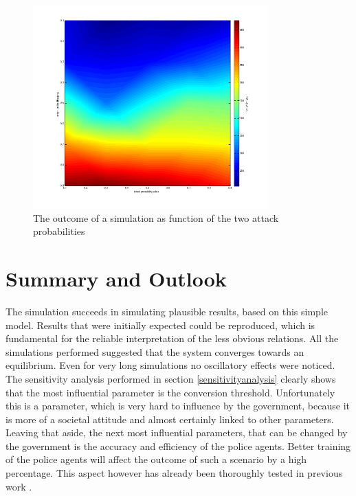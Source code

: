 \documentclass[11pt]{article}
\begin{document}
\begin{figure}[h!]
	\centering
	\includegraphics[width=9cm]{attackprob.png}
   \caption{The outcome of a simulation as function of the two attack probabilities}\label{attackprob}
\end{figure}
\newpage
\section{Summary and Outlook}
The simulation succeeds in simulating plausible results, based on this simple model. Results that were initially expected could be reproduced, which is fundamental for the reliable interpretation of the less obvious relations. All the simulations performed suggested that the system converges towards an equilibrium. Even for very long simulations no oscillatory effects were noticed. The sensitivity analysis performed in section \ref{sensitivityanalysis} clearly shows that the most influential parameter is the conversion threshold. Unfortunately this is a parameter, which is very hard to influence by the government, because it is more of a societal attitude and almost certainly linked to other parameters. Leaving that aside, the next most influential parameters, that can be changed by the government is the accuracy and efficiency of the police agents. Better training of the police agents will affect the outcome of such a scenario by a high percentage. This aspect however has already been thoroughly tested in previous work \cite{bennett,kouzoupis}. 
\end{document}
